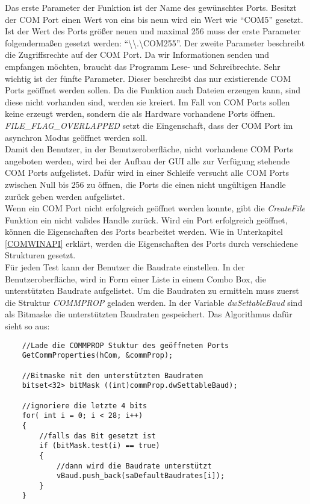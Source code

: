 Das erste Parameter der Funktion ist der Name des gewünschtes Ports. Besitzt der COM Port einen Wert von eins bis neun wird ein Wert wie "`COM5"' gesetzt. Ist der Wert des Ports größer neuen und maximal 256 muss der erste Parameter folgendermaßen gesetzt werden: "`\textbackslash\textbackslash.\textbackslash COM255"'. Der zweite Parameter beschreibt die Zugriffsrechte auf der COM Port. Da wir Informationen senden und empfangen möchten, braucht das Programm Lese- und Schreibrechte. Sehr wichtig ist der fünfte Parameter. Dieser beschreibt das nur existierende COM Ports geöffnet werden sollen. Da die Funktion auch Dateien erzeugen kann, sind diese nicht vorhanden sind, werden sie kreiert. Im Fall von COM Ports sollen keine erzeugt werden, sondern die als Hardware vorhandene Ports öffnen. \textit{FILE\_FLAG\_OVERLAPPED} setzt die Eingenschaft, dass der COM Port im asynchron Modus geöffnet werden soll.\\

Damit den Benutzer, in der Benutzeroberfläche, nicht vorhandene COM Ports angeboten werden, wird bei der Aufbau der GUI alle zur Verfügung stehende COM Ports aufgelistet. Dafür wird in einer Schleife versucht alle COM Ports zwischen Null bis 256 zu öffnen, die Ports die einen nicht ungültigen Handle zurück geben werden aufgelistet.\\


Wenn ein COM Port nicht erfolgreich geöffnet werden konnte, gibt die \textit{CreateFile} Funktion ein nicht valides Handle zurück. Wird ein Port erfolgreich geöffnet, können die Eigenschaften des Ports bearbeitet werden. Wie in Unterkapitel \ref{COMWINAPI} erklärt, werden die Eigenschaften des Ports durch verschiedene Strukturen gesetzt.\\

Für jeden Test kann der Benutzer die Baudrate einstellen. In der Benutzeroberfläche, wird in Form einer Liste in einem Combo Box, die unterstützten Baudrate aufgelistet. Um die Baudraten zu ermitteln muss zuerst die Struktur \textit{COMMPROP} geladen werden. In der Variable \textit{dwSettableBaud} sind als Bitmaske die unterstützten Baudraten gespeichert. Das Algorithmus dafür sieht so aus:

\begin{lstlisting}
	//Lade die COMMPROP Stuktur des geöffneten Ports	 
	GetCommProperties(hCom, &commProp);
 
 	//Bitmaske mit den unterstützten Baudraten
	bitset<32> bitMask ((int)commProp.dwSettableBaud);
	
	//ignoriere die letzte 4 bits
	for( int i = 0; i < 28; i++)
	{
		//falls das Bit gesetzt ist
		if (bitMask.test(i) == true)
		{
			//dann wird die Baudrate unterstützt
			vBaud.push_back(saDefaultBaudrates[i]);
		}
	}
\end{lstlisting}

